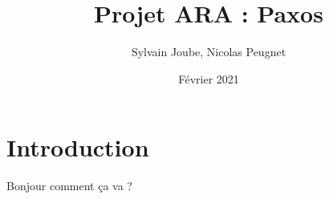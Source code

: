 \documentclass[french]{article}
\title{Projet ARA : Paxos}
\date{Février 2021}
\author{Sylvain Joube, Nicolas Peugnet}
\begin{document}
\maketitle

\tableofcontents

\section{Introduction}

Bonjour comment ça va ?
\end{document}
